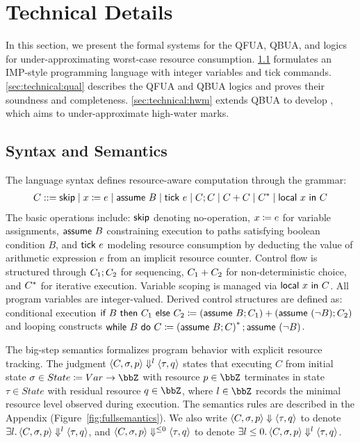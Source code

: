 \section{Technical Details}
\label{sec:technical}



In this section, we present the formal systems for the QFUA, QBUA, and \QBUAd logics for under-approximating worst-case resource consumption.
%
\cref{sec:technical:lang} formulates an IMP-style programming language with integer variables and tick commands.
%
\cref{sec:technical:qual} describes the QFUA and QBUA logics and proves their soundness and completeness.
%
\cref{sec:technical:hwm} extends QBUA to develop \QBUAd, which aims to under-approximate high-water marks.

\subsection{Syntax and Semantics}
\label{sec:technical:lang}

The language syntax defines resource-aware computation through the grammar:
\begin{align*}
C ::= \textsf{skip} \mid x\coloneqq e \mid \textsf{assume}~B \mid \textsf{tick}~e 
     \mid C;C \mid C+C \mid C^* \mid \textsf{local}~x~\textsf{in}~C
\end{align*}
The basic operations include: $\textsf{skip}$ denoting no-operation, $x\coloneqq e$ for variable assignments, $\textsf{assume}~B$ constraining execution to paths satisfying boolean condition $B$, and $\textsf{tick}~e$ modeling resource consumption by deducting the value of arithmetic expression $e$ from an implicit resource counter.
Control flow is structured through $C_1;C_2$ for sequencing, $C_1+C_2$ for non-deterministic choice, and $C^*$ for iterative execution. Variable scoping is managed via $\textsf{local}~x~\textsf{in}~C$.
All program variables are integer-valued.
Derived control structures are defined as: conditional execution $\textsf{if}~B~\textsf{then}~C_1~\textsf{else}~C_2 \coloneqq (\textsf{assume}~B;C_1)+(\textsf{assume}~(\neg B);C_2)$ and looping constructs $\textsf{while}~B~\textsf{do}~C \coloneqq \left(\textsf{assume}~B;C\right)^*;\textsf{assume}~(\neg B)$.

The big-step semantics formalizes program behavior with explicit resource tracking.
The judgment $\left\langle C,\sigma,p\right\rangle\Downarrow^{l}\left\langle\tau,q\right\rangle$ states that executing $C$ from initial state $\sigma \in State \coloneqq Var \to \bbZ$ with resource $p \in \bbZ$ terminates in state $\tau \in State$ with residual resource $q \in \bbZ$, where $l \in \bbZ$ records the minimal resource level observed during execution.
The semantics rules are described in the Appendix (Figure~\ref{fig:fullsemantics}).
We also write $\left\langle C,\sigma,p\right\rangle\Downarrow\left\langle\tau,q\right\rangle$ to denote $\exists l.\left\langle C,\sigma,p\right\rangle\Downarrow^{l}\left\langle\tau,q\right\rangle$, and $\left\langle C,\sigma,p\right\rangle\Downarrow^{\le 0}\left\langle\tau,q\right\rangle$ to denote $\exists l\le 0.\left\langle C,\sigma,p\right\rangle\Downarrow^{l}\left\langle\tau,q\right\rangle$.

